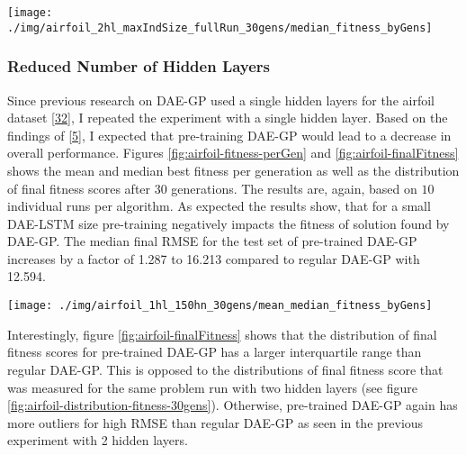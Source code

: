\documentclass[
  11pt,
]{article}
\let\origfigure\figure
\let\endorigfigure\endfigure
\renewenvironment{figure}[1][2] {
    \expandafter\origfigure\expandafter[H]
} {
    \endorigfigure
}
\begin{document}
\begin{figure}[c]

{\centering \texttt{[image: ./img/airfoil\_2hl\_maxIndSize\_fullRun\_30gens/median\_fitness\_byGens]} 

}

\caption{Median Best Fitness over 30 Generations - Airfoil - Dynamic adjustment of regular DAE-GP}\label{fig:airfoil-maxIndSize-fitness}
\end{figure}

\hypertarget{reduced-number-of-hidden-layers}{%
\subsubsection{Reduced Number of Hidden Layers}\label{reduced-number-of-hidden-layers}}

Since previous research on DAE-GP used a single hidden layers for the airfoil dataset {[}\protect\hyperlink{ref-dae-gp_2022_symreg}{32}{]}, I repeated the experiment with a single hidden layer. Based on the findings of {[}\protect\hyperlink{ref-pmlr-v5-erhan09a}{5}{]}, I expected that pre-training DAE-GP would lead to a decrease in overall performance. Figures \ref{fig:airfoil-fitness-perGen} and \ref{fig:airfoil-finalFitness} shows the mean and median best fitness per generation as well as the distribution of final fitness scores after 30 generations. The results are, again, based on \(10\) individual runs per algorithm. As expected the results show, that for a small DAE-LSTM size pre-training negatively impacts the fitness of solution found by DAE-GP. The median final RMSE for the test set of pre-trained DAE-GP increases by a factor of 1.287 to 16.213 compared to regular DAE-GP with 12.594.

\begin{figure}[c]

{\centering \texttt{[image: ./img/airfoil\_1hl\_150hn\_30gens/mean\_median\_fitness\_byGens]} 

}

\caption{Fitness over 30 Generations - Airfoil - Single Hidden Layer}\label{fig:airfoil-fitness-perGen}
\end{figure}

Interestingly, figure \ref{fig:airfoil-finalFitness} shows that the distribution of final fitness scores for pre-trained DAE-GP has a larger interquartile range than regular DAE-GP. This is opposed to the distributions of final fitness score that was measured for the same problem run with two hidden layers (see figure \ref{fig:airfoil-distribution-fitness-30gens}). Otherwise, pre-trained DAE-GP again has more outliers for high RMSE than regular DAE-GP as seen in the previous experiment with 2 hidden layers.
\end{document}

